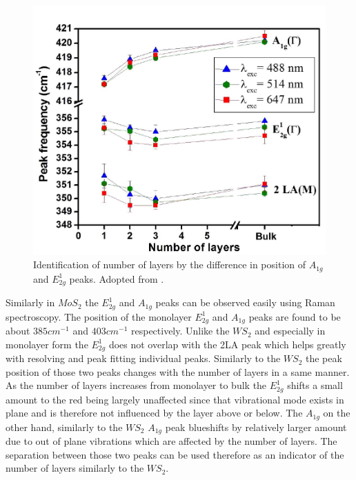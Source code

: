 \begin{figure}
	\begin{center}
		\includegraphics[scale=0.3]{NumberLayerIdentificationRaman.png}
		\caption{Identification of number of layers by the difference in position of $A_{1g}$ and $E^1_{2g}$ peaks. Adopted from \cite{Berkdemir2013}.}
		\label{fig:LayerNumberIdentificationRamanShiftWS2}
	\end{center}
\end{figure}

\newpage
Similarly in $MoS_2$ the $E^1_{2g}$ and $A_{1g}$ peaks can be observed easily using Raman spectroscopy. The position of the monolayer $E^1_{2g}$ and $A_{1g}$ peaks are found to be about $385 cm^{-1}$ and $403 cm^{-1}$ respectively. Unlike the $WS_2$ and especially in monolayer form the $E^1_{2g}$ does not overlap with the 2LA peak which helps greatly with resolving and peak fitting individual peaks. Similarly to the $WS_2$ the peak position of those two peaks changes with the number of layers in a same manner. As the number of layers increases from monolayer to bulk the $E^1_{2g}$ shifts a small amount to the red being largely unaffected since that vibrational mode exists in plane and is therefore not influenced by the layer above or below. The $A_{1g}$ on the other hand, similarly to the $WS_2$ $A_{1g}$ peak blueshifts by relatively larger amount due to out of plane vibrations which are affected by the number of layers. The separation between those two peaks can be used therefore as an indicator of the number of layers similarly to the $WS_2$. 

